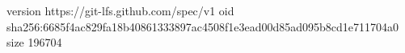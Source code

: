version https://git-lfs.github.com/spec/v1
oid sha256:6685f4ac829fa18b40861333897ac4508f1e3ead00d85ad095b8cd1e711704a0
size 196704
